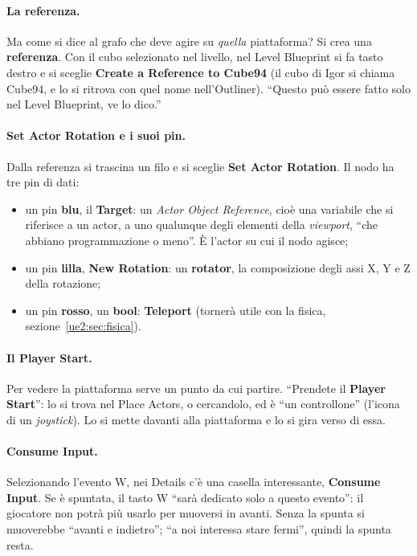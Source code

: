 \paragraph{La referenza.} Ma come si dice al grafo che deve agire su \emph{quella}
piattaforma? Si crea una \textbf{referenza}. Con il cubo selezionato nel livello, nel
Level Blueprint si fa tasto destro e si sceglie \textbf{Create a Reference to Cube94}
(il cubo di Igor si chiama Cube94, e lo si ritrova con quel nome nell'Outliner). ``Questo
può essere fatto solo nel Level Blueprint, ve lo dico.''

\paragraph{Set Actor Rotation e i suoi pin.} Dalla referenza si trascina un filo e si
sceglie \textbf{Set Actor Rotation}. Il nodo ha tre pin di dati:
\begin{itemize}
  \item un pin \textbf{blu}, il \textbf{Target}: un \emph{Actor Object Reference}, cioè
        una variabile che si riferisce a un actor, a uno qualunque degli elementi della
        \emph{viewport}, ``che abbiano programmazione o meno''. È l'actor su cui il nodo
        agisce;
  \item un pin \textbf{lilla}, \textbf{New Rotation}: un \textbf{rotator}, la
        composizione degli assi X, Y e Z della rotazione;
  \item un pin \textbf{rosso}, un \textbf{bool}: \textbf{Teleport} (tornerà utile con
        la fisica, sezione~\ref{ue2:sec:fisica}).
\end{itemize}

\paragraph{Il Player Start.} Per vedere la piattaforma serve un punto da cui partire.
``Prendete il \textbf{Player Start}'': lo si trova nel Place Actors, o cercandolo, ed è
``un controllone'' (l'icona di un \emph{joystick}). Lo si mette davanti alla piattaforma
e lo si gira verso di essa.

\paragraph{Consume Input.} Selezionando l'evento W, nei Details c'è una casella
interessante, \textbf{Consume Input}. Se è spuntata, il tasto W ``sarà dedicato solo a
questo evento'': il giocatore non potrà più usarlo per muoversi in avanti. Senza la spunta
si muoverebbe ``avanti e indietro''; ``a noi interessa stare fermi'', quindi la spunta
resta.

